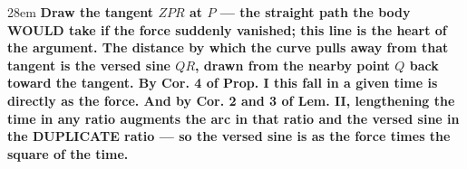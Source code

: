 \documentclass[border=4pt]{standalone}
\begin{document}
\begin{varwidth}{28em}
\large\bfseries
Draw the tangent $ZPR$ at $P$ — the straight path the body WOULD take if the force suddenly      vanished; this line is the heart of the argument. The distance by which the curve pulls away from that      tangent is the versed sine $QR$, drawn from the nearby point $Q$ back toward the tangent. By Cor. 4 of      Prop. I this fall in a given time is directly as the force. And by Cor. 2 and 3 of Lem. II, lengthening the      time in any ratio augments the arc in that ratio and the versed sine in the DUPLICATE ratio — so the versed      sine is as the force times the square of the time.
\end{varwidth}
\end{document}

